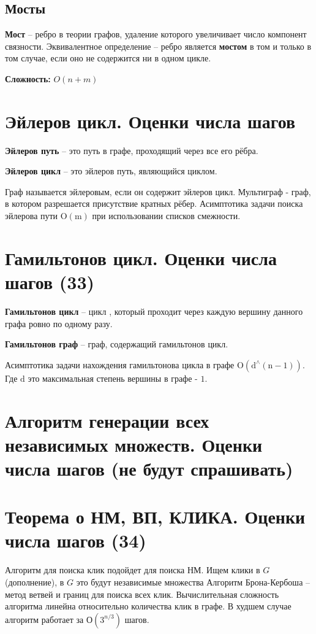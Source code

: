 \documentclass[40pt]{article}
\begin{document}
\subsection{Мосты}

\textbf{Мост} -- ребро в теории графов, удаление которого увеличивает число компонент связности. Эквивалентное определение -- ребро является \textbf{мостом} в том и только в том случае, если оно не содержится ни в одном цикле.

\textbf{Сложность: } $O(n + m)$

\section{Эйлеров цикл.  Оценки числа шагов}

\textbf{Эйлеров путь} -- это путь в графе, проходящий через все его рёбра.

\textbf{Эйлеров цикл} -- это эйлеров путь, являющийся циклом.

Граф называется эйлеровым, если он содержит эйлеров цикл.
Мультиграф - граф, в котором разрешается присутствие кратных рёбер.
Асимптотика задачи поиска эйлерова пути $\mathrm{O}(\mathrm{m})$ при использовании списков смежности.


\section{Гамильтонов цикл.  Оценки числа шагов (33)}

\textbf{Гамильтонов цикл} -- цикл , который проходит через каждую вершину данного графа ровно по одному разу.

\textbf{Гамильтонов граф} -- граф, содержащий гамильтонов цикл.

Асимптотика задачи нахождения гамильтонова цикла в графе $\mathrm{O}\left(\mathrm{d}^{\wedge}(\mathrm{n}-1)\right)$. Где $\mathrm{d}$ это максимальная степень вершины в графе - $1 .$

\section{Алгоритм генерации всех независимых множеств.  Оценки числа шагов (не будут спрашивать)}

\section{Теорема о НМ, ВП, КЛИКА.  Оценки числа шагов (34)}

Алгоритм для поиска клик подойдет для поиска НМ. Ищем клики в $G$ (дополнение), в $G$ это будут независимые множества Алгоритм Брона-Кербоша -- метод ветвей и границ для поиска всех клик. Вычислительная сложность алгоритма линейна относительно количества клик в графе. В худшем случае алгоритм работает за $О(3^{n/3})$ шагов.
\end{document}
